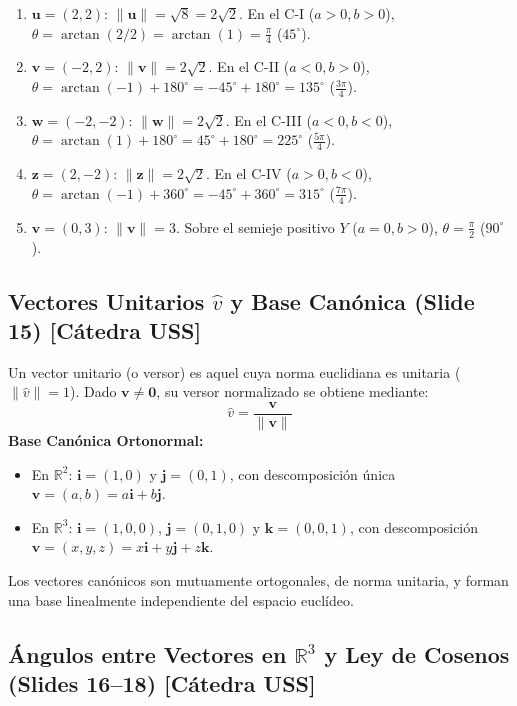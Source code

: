 \documentclass[10pt,letterpaper]{article}
\newcommand{\iu}{\mathbf{i}}
\newcommand{\ju}{\mathbf{j}}
\newcommand{\ku}{\mathbf{k}}
\newcommand{\vu}{\mathbf{u}}
\newcommand{\vv}{\mathbf{v}}
\newcommand{\vw}{\mathbf{w}}
\begin{document}
\begin{cajaEjemplo}
\begin{enumerate}
    \item $\vu = (2, 2)$: $\|\vu\| = \sqrt{8} = 2\sqrt{2}$. En el C-I ($a>0, b>0$), $\theta = \arctan(2/2) = \arctan(1) = \frac{\pi}{4}$ ($45^\circ$).
    \item $\vv = (-2, 2)$: $\|\vv\| = 2\sqrt{2}$. En el C-II ($a<0, b>0$), $\theta = \arctan(-1) + 180^\circ = -45^\circ + 180^\circ = 135^\circ$ ($\frac{3\pi}{4}$).
    \item $\vw = (-2, -2)$: $\|\vw\| = 2\sqrt{2}$. En el C-III ($a<0, b<0$), $\theta = \arctan(1) + 180^\circ = 45^\circ + 180^\circ = 225^\circ$ ($\frac{5\pi}{4}$).
    \item $\mathbf{z} = (2, -2)$: $\|\mathbf{z}\| = 2\sqrt{2}$. En el C-IV ($a>0, b<0$), $\theta = \arctan(-1) + 360^\circ = -45^\circ + 360^\circ = 315^\circ$ ($\frac{7\pi}{4}$).
    \item $\vv = (0, 3)$: $\|\vv\| = 3$. Sobre el semieje positivo $Y$ ($a=0, b>0$), $\theta = \frac{\pi}{2}$ ($90^\circ$).
\end{enumerate}
\end{cajaEjemplo}

\subsection{\texorpdfstring{Vectores Unitarios $\hat{v}$ y Base Canónica (Slide 15)}{Vectores Unitarios y Base Canónica (Slide 15)} [Cátedra USS]}
Un vector unitario (o versor) es aquel cuya norma euclidiana es unitaria ($\|\hat{v}\| = 1$). Dado $\vv \neq \mathbf{0}$, su versor normalizado se obtiene mediante:
\[
\hat{v} = \frac{\vv}{\|\vv\|}
\]
\textbf{Base Canónica Ortonormal:}
\begin{itemize}
    \item En $\mathbb{R}^2$: $\iu = (1, 0)$ y $\ju = (0, 1)$, con descomposición única $\vv = (a, b) = a\iu + b\ju$.
    \item En $\mathbb{R}^3$: $\iu = (1, 0, 0)$, $\ju = (0, 1, 0)$ y $\ku = (0, 0, 1)$, con descomposición $\vv = (x, y, z) = x\iu + y\ju + z\ku$.
\end{itemize}
Los vectores canónicos son mutuamente ortogonales, de norma unitaria, y forman una base linealmente independiente del espacio euclídeo.

\subsection{\texorpdfstring{Ángulos entre Vectores en $\mathbb{R}^3$ y Ley de Cosenos (Slides 16--18)}{Ángulos entre Vectores en R3 y Ley de Cosenos (Slides 16--18)} [Cátedra USS]}
\end{document}
